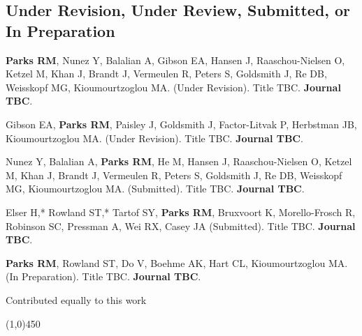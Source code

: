 \subsection*{Under Revision, Under Review, Submitted, or In Preparation}

\noindent \textbf{Parks RM}, Nunez Y, Balalian A,  Gibson EA, Hansen J, Raaschou-Nielsen O, Ketzel M, Khan J, Brandt J, Vermeulen R, Peters S, Goldsmith J, Re DB, Weisskopf MG, Kioumourtzoglou MA. (Under Revision). Title TBC. \textbf{Journal TBC}. \medskip

\noindent Gibson EA, \textbf{Parks RM}, Paisley J, Goldsmith J, Factor-Litvak P, Herbstman JB, Kioumourtzoglou MA. (Under Revision). Title TBC. \textbf{Journal TBC}. \medskip

\noindent Nunez Y, Balalian A, \textbf{Parks RM}, He M, Hansen J, Raaschou-Nielsen O, Ketzel M, Khan J, Brandt J, Vermeulen R, Peters S, Goldsmith J, Re DB, Weisskopf MG, Kioumourtzoglou MA. (Submitted). Title TBC. \textbf{Journal TBC}. \medskip

\noindent Elser H,* Rowland ST,* Tartof SY, \textbf{Parks RM}, Bruxvoort K, Morello-Frosch R, Robinson SC, Pressman A, Wei RX, Casey JA (Submitted). Title TBC. \textbf{Journal TBC}. \medskip

\noindent \textbf{Parks RM}, Rowland ST, Do V, Boehme AK, Hart CL, Kioumourtzoglou MA. (In Preparation). Title TBC. \textbf{Journal TBC}. \medskip

\noindent * Contributed equally to this work
											
\begin{center} \line(1,0){450} \end{center}